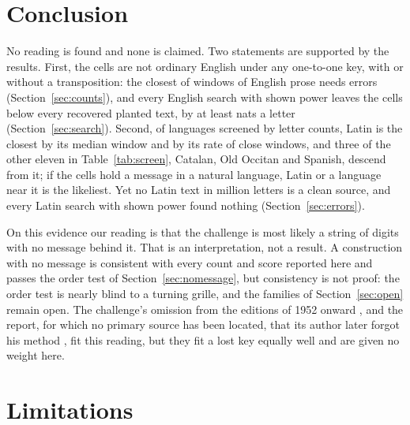 \documentclass[11pt]{article}
\theoremstyle{definition}
\begin{document}
\section{Conclusion}\label{sec:conclusion}

No reading is found and none is claimed. Two statements are supported by the results. First, the cells are not ordinary English under any one-to-one key, with or without a transposition: the closest of \corpusWindows{} windows of English prose needs \corpusClosestDistance{} errors (Section~\ref{sec:counts}), and every English search with shown power leaves the cells below every recovered planted text, by at least \gapEnglishLow{} nats a letter (Section~\ref{sec:search}). Second, of \allLanguages{} languages screened by letter counts, Latin is the closest by its median window and by its rate of close windows, and three of the other eleven in Table~\ref{tab:screen}, Catalan, Old Occitan and Spanish, descend from it; if the cells hold a message in a natural language, Latin or a language near it is the likeliest. Yet no Latin text in \latinLettersAll{} million letters is a clean source, and every Latin search with shown power found nothing (Section~\ref{sec:errors}).

On this evidence our reading is that the challenge is most likely a string of digits with no message behind it. That is an interpretation, not a result. A construction with no message is consistent with every count and score reported here and passes the order test of Section~\ref{sec:nomessage}, but consistency is not proof: the order test is nearly blind to a turning grille, and the families of Section~\ref{sec:open} remain open. The challenge's omission from the editions of 1952 onward \cite{numberworld2015}, and the report, for which no primary source has been located, that its author later forgot his method \cite{wikipedia2026}, fit this reading, but they fit a lost key equally well and are given no weight here.

\section{Limitations}\label{sec:limits}
\end{document}
